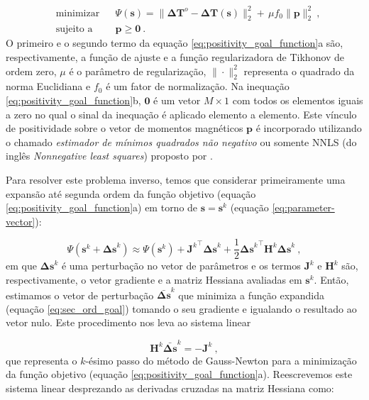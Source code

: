 \begin{subequations}
	\begin{align}
	& \text{minimizar}
	& &\Psi(\mathbf{s}) =\lVert \mathbf{\Delta T}^{o} - \mathbf{\Delta T} (\mathbf{s}) 
	\rVert_{2}^{2} + \, \mu f_0 \parallel \mathbf{p} \parallel_{2}^{2} \: , \\
	& \text{sujeito a}
	& & \mathbf{p} \geqslant \mathbf{0} \: .
	\end{align}
	\label{eq:positivity_goal_function}
\end{subequations}
O primeiro e o segundo termo da equação \ref{eq:positivity_goal_function}a são, respectivamente, a função de ajuste e a função regularizadora de Tikhonov de ordem zero, $\mu$ é o parâmetro de regularização, $\| \cdot \|_{2}^{2}$ representa o quadrado da norma Euclidiana e $f_{0}$ é um fator de normalização. Na inequação \ref{eq:positivity_goal_function}b, $\mathbf{0}$ é um vetor $M \times 1$ com todos os elementos iguais a zero no qual o sinal da inequação é aplicado elemento a elemento. Este vínculo de positividade sobre o vetor de momentos magnéticos $\mathbf{p}$ é incorporado utilizando o chamado \textit{estimador de mínimos quadrados não negativo} ou somente NNLS (do inglês \textit{Nonnegative least squares}) proposto por \cite{lawson_hanson_1974}.

Para resolver este problema inverso, temos que considerar primeiramente uma expansão até segunda ordem da função objetivo (equação \ref{eq:positivity_goal_function}a) em torno de $\mathbf{s} = \mathbf{s}^{k}$ (equação \ref{eq:parameter-vector}):

\begin{equation}
\Psi(\mathbf{s}^{k} + \mathbf{\Delta s}^{k}) \approx \Psi(\mathbf{s}^{k}) + 
{\mathbf{J}^{k}}^{\top} \mathbf{\Delta s}^{k} + 
\frac{1}{2} {\mathbf{\Delta s}^{k}}^{\top} \mathbf{H}^{k} \mathbf{\Delta s}^{k}  \: ,
\label{eq:sec_ord_goal}
\end{equation}
em que $\mathbf{\Delta s}^{k}$ é uma perturbação no vetor de parâmetros e os termos $\mathbf{J}^{k}$ e $\mathbf{H}^{k}$ são, respectivamente, o vetor gradiente e a matriz Hessiana avaliadas em $\mathbf{s}^{k}$. Então, estimamos o vetor de perturbação $\bar{\mathbf{\Delta s}}^k$ que minimiza a função expandida (equação \ref{eq:sec_ord_goal}) tomando o seu gradiente e igualando o resultado ao vetor nulo. Este procedimento nos leva ao sistema linear 

\begin{equation}
\mathbf{H}^{k} \bar{\mathbf{\Delta s}}^{k} = - \mathbf{J}^{k} \: ,
\label{eq:linear_sys_GN}
\end{equation}
que representa o $k$-ésimo passo do método de Gauss-Newton \citep{aster2005} para a minimização da função objetivo (equação \ref{eq:positivity_goal_function}a). Reescrevemos este sistema linear desprezando as derivadas cruzadas na matriz Hessiana como: 

